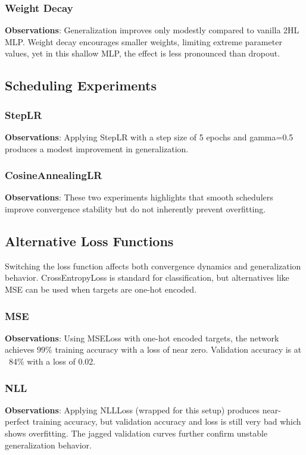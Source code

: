 \documentclass[12pt]{article}
\begin{document}
		\subsubsection{Weight Decay}
			
			\textbf{Observations}: Generalization improves only modestly compared to vanilla 2HL MLP. Weight decay encourages smaller weights, limiting extreme parameter values, yet in this shallow MLP, the effect is less pronounced than dropout.
		
			\subsection{Scheduling Experiments}
			\subsubsection{StepLR}
				
			\textbf{Observations}: Applying StepLR with a step size of 5 epochs and gamma=0.5 produces a modest improvement in generalization.
			\subsubsection{CosineAnnealingLR}
			
					\textbf{Observations}: These two experiments highlights that smooth schedulers improve convergence stability but do not inherently prevent overfitting.
			
				\subsection{Alternative Loss Functions}
				Switching the loss function affects both convergence dynamics and generalization behavior. CrossEntropyLoss is standard for classification, but alternatives like MSE can be used when targets are one-hot encoded.
				\subsubsection{MSE}
				
				\textbf{Observations}: 	Using MSELoss with one-hot encoded targets, the network achieves 99\% training accuracy with a loss of near zero. Validation accuracy is at ~84\% with a loss of 0.02.
				\subsubsection{NLL}
				
				\textbf{Observations}: Applying NLLLoss (wrapped for this setup) produces near-perfect training accuracy, but validation accuracy and loss is still very bad which shows overfitting. The jagged validation curves further confirm unstable generalization behavior.
\end{document}
